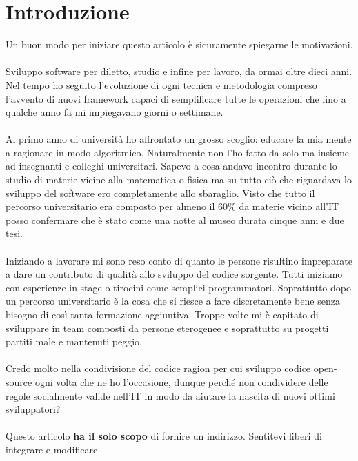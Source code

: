 \section{Introduzione}

Un buon modo per iniziare questo articolo è sicuramente spiegarne le motivazioni. \\ \\
Sviluppo software per diletto, studio e infine per lavoro, da ormai oltre dieci anni. Nel tempo ho seguito l'evoluzione di ogni tecnica e metodologia compreso l'avvento di nuovi framework capaci di semplificare tutte le operazioni che fino a qualche anno fa mi impiegavano giorni o settimane. 
\\ \\
Al primo anno di università ho affrontato un grosso scoglio: educare la mia mente a ragionare in modo algoritmico. Naturalmente non l'ho fatto da solo ma insieme ad insegnanti e colleghi universitari. Sapevo a cosa andavo incontro durante lo studio di materie vicine alla matematica o fisica ma su tutto ciò che riguardava lo sviluppo del software ero completamente allo sbaraglio. Visto che tutto il percorso universitario era composto per almeno il 60\% da materie vicino all'IT posso confermare che è stato come una notte al museo durata cinque anni e due tesi. 
\\ \\ 
Iniziando a lavorare mi sono reso conto di quanto le persone risultino impreparate a dare un contributo di qualità allo sviluppo del codice sorgente. Tutti iniziamo con esperienze in stage o tirocini come semplici programmatori. Soprattutto dopo un percorso universitario è la cosa che si riesce a fare discretamente bene senza bisogno di così tanta formazione aggiuntiva. Troppe volte mi è capitato di sviluppare in team composti da persone eterogenee e soprattutto su progetti partiti male e mantenuti peggio. 
\\ \\
Credo molto nella condivisione del codice ragion per cui sviluppo codice open-source ogni volta che ne ho l'occasione, dunque perché non condividere delle regole socialmente valide nell'IT in modo da aiutare la nascita di nuovi ottimi sviluppatori?\\ \\
Questo articolo \textbf{ha il solo scopo} di fornire un indirizzo. Sentitevi liberi di integrare e modificare

